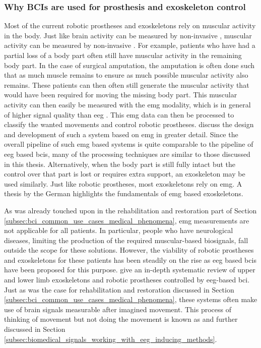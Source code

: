 
\subsubsection{Why BCIs are used for prosthesis and exoskeleton control}
\label{subsubsec:bci_common_use_cases_prosthesis_exoskeleton_why}

Most of the current robotic prostheses and exoskeletons rely on muscular activity in the body.
Just like brain activity can be measured by non-invasive , muscular activity can be measured by non-invasive .
For example, patients who have had a partial loss of a body part often still have muscular activity in the remaining body part.
In the case of surgical amputation, the amputation is often done such that as much muscle remains to ensure as much possible muscular activity also remains.
These patients can then often still generate the muscular activity that would have been required for moving the missing body part.
This muscular activity can then easily be measured with the \gls{emg} modality, which is in general of higher signal quality than \gls{eeg} \citep{hybrid_eeg_emg_prosthesis}.
This \gls{emg} data can then be processed to classify the wanted movements and control robotic prostheses.
 discuss the design and development of such a system based on \gls{emg} in greater detail.
Since the overall pipeline of such \gls{emg} based systems is quite comparable to the pipeline of \gls{eeg} based \glspl{bci}, many of the processing techniques are similar to those discussed in this thesis.
Alternatively, when the body part is still fully intact but the control over that part is lost or requires extra support, an exoskeleton may be used similarly.
Just like robotic prostheses, most exoskeletons rely on \gls{emg}.
A thesis by the German \citet{emg_exoskeleton} highlights the fundamentals of \gls{emg} based exoskeletons.

As was already touched upon in the rehabilitation and restoration part of Section \ref{subsec:bci_common_use_cases_medical_phenomena}, \gls{emg} measurements are not applicable for all patients.
In particular, people who have neurological diseases, limiting the production of the required muscular-based \glspl{biosignal}, fall outside the scope for these solutions.
However, the viability of robotic prostheses and exoskeletons for these patients has been steadily on the rise as \gls{eeg} based \glspl{bci} have been proposed for this purpose.
 give an in-depth systematic review of upper and lower limb exoskeletons and robotic prostheses controlled by \gls{eeg}-based \gls{bci}.
Just as was the case for rehabilitation and restoration discussed in Section \ref{subsec:bci_common_use_cases_medical_phenomena}, these systems often make use of brain signals measurable after imagined movement.
This process of thinking of movement but not doing the movement is known as  and further discussed in Section \ref{subsec:biomedical_signals_working_with_eeg_inducing_methods}.


